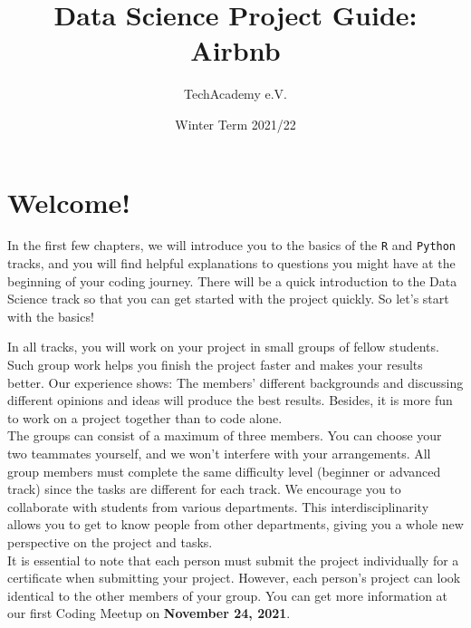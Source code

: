 \documentclass[
  11pt,
]{article}
\title{Data Science Project Guide: Airbnb}
\author{TechAcademy e.V.}
\date{Winter Term 2021/22}
\begin{document}
\maketitle

\clearpage

\addtolength{\headheight}{17.82275pt}

\fancyfoot{}
\fancyfoot[R]{\thepage}
\addtolength{\headheight}{17.82275pt}


\renewcommand{\headrulewidth}{0.25pt}
\renewcommand{\footrulewidth}{0.25pt}

\tableofcontents
\clearpage

\hypertarget{welcome}{%
\section{Welcome!}\label{welcome}}

In the first few chapters, we will introduce you to the basics of the \texttt{R} and \texttt{Python} tracks, and you will find helpful explanations to questions you might have at the beginning of your coding journey. There will be a quick introduction to the Data Science track so that you can get started with the project quickly. So let's start with the basics!

In all tracks, you will work on your project in small groups of fellow students. Such group work helps you finish the project faster and makes your results better. Our experience shows: The members' different backgrounds and discussing different opinions and ideas will produce the best results. Besides, it is more fun to work on a project together than to code alone.\\
The groups can consist of a maximum of three members. You can choose your two teammates yourself, and we won't interfere with your arrangements. All group members must complete the same difficulty level (beginner or advanced track) since the tasks are different for each track. We encourage you to collaborate with students from various departments. This interdisciplinarity allows you to get to know people from other departments, giving you a whole new perspective on the project and tasks.\\
It is essential to note that each person must submit the project individually for a certificate when submitting your project. However, each person's project can look identical to the other members of your group. You can get more information at our first Coding Meetup on \textbf{November 24, 2021}.
\end{document}

